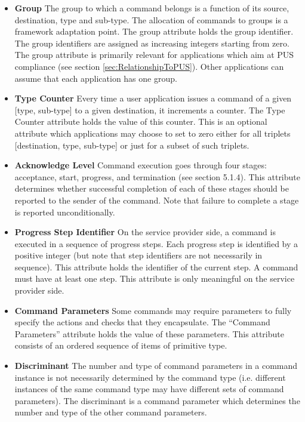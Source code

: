 \begin{itemize}
\item \textbf{Group}
The group to which a command belongs is a function of its source, destination, type and sub-type. The allocation of commands to groups is a framework adaptation point. The group attribute holds the group identifier. The group identifiers are assigned as increasing integers starting from zero. The group attribute is primarily relevant for applications which aim at PUS compliance (see section \ref{sec:RelationshipToPUS}). Other applications can assume that each application has one group.

\item \textbf{Type Counter}
Every time a user application issues a command of a given [type, sub-type] to a given destination, it increments a counter. The Type Counter attribute holds the value of this counter. This is an optional attribute which applications may choose to set to zero either for all triplets [destination, type, sub-type] or just for a subset of such triplets.

\item \textbf{Acknowledge Level}
Command execution goes through four stages: acceptance, start, progress, and termination (see section 5.1.4). This attribute determines whether successful completion of each of these stages should be reported to the sender of the command. Note that failure to complete a stage is reported unconditionally.

\item \textbf{Progress Step Identifier}
On the service provider side, a command is executed in a sequence of progress steps. Each progress step is identified by a positive integer (but note that step identifiers are not necessarily in sequence). This attribute holds the identifier of the current step. A command must have at least one step. This attribute is only meaningful on the service provider side.

\item \textbf{Command Parameters}
Some commands may require parameters to fully specify the actions and checks that they encapsulate. The “Command Parameters” attribute holds the value of these parameters. This attribute consists of an ordered sequence of items of primitive type. 

\item \textbf{Discriminant}
The number and type of command parameters in a command instance is not necessarily determined by the command type (i.e. different instances of the same command type may have different sets of command parameters). The discriminant is a command parameter which determines the number and type of the other command parameters. 


\end{itemize}
